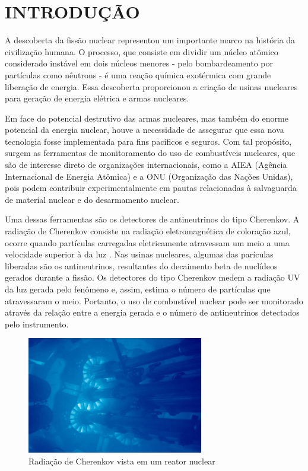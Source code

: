 \chapter{INTRODUÇÃO} \label{cap:intro}
\vspace{-2cm}

A descoberta da fissão nuclear representou um importante marco na história da civilização humana. O processo, que consiste em dividir um núcleo atômico considerado instável em dois núcleos menores - pelo bombardeamento por partículas como nêutrons - é uma reação química exotérmica com grande liberação de energia. Essa descoberta proporcionou a criação de usinas nucleares para geração de energia elétrica e armas nucleares. 

Em face do potencial destrutivo das armas nucleares, mas também do enorme potencial da energia nuclear, houve a necessidade de assegurar que essa nova tecnologia fosse implementada para fins pacíficos e seguros. Com tal propósito, surgem as ferramentas de monitoramento do uso de combustíveis nucleares, que são de interesse direto de organizações internacionais, como a AIEA (Agência Internacional de Energia Atômica) e a ONU (Organização das Nações Unidas), pois podem contribuir experimentalmente em pautas relacionadas à salvaguarda de material nuclear e do desarmamento nuclear.

Uma dessas ferramentas são os detectores de antineutrinos do tipo Cherenkov. A radiação de Cherenkov consiste na radiação eletromagnética de coloração azul, ocorre quando partículas carregadas eletricamente atravessam um meio a uma velocidade superior à da luz \cite{leo2012techniques}. Nas usinas nucleares, algumas das parículas liberadas são os antineutrinos, resultantes do decaimento beta de nuclídeos gerados durante a fissão. Os detectores do tipo Cherenkov medem a radiação UV da luz gerada pelo fenômeno e, assim, estima o número de partículas que atravessaram o meio. Portanto, o uso de combustível nuclear pode ser monitorado através da relação entre a energia gerada e o número de antineutrinos detectados pelo instrumento.


\begin{figure}[H]
	\centering
		\includegraphics[width=7.7cm]{textuais/introducao/figuras/Cherenkov1.jpg}
		\caption{Radiação de Cherenkov vista em um reator nuclear}
		\label{fig:cherenkov}
\end{figure}%

